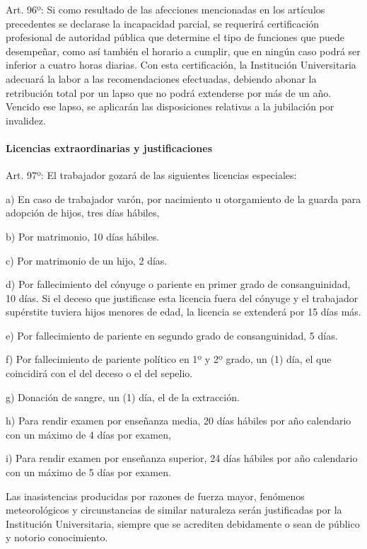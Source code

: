 \documentclass[]{article}
\let\oldparagraph\paragraph
\renewcommand{\paragraph}[1]{\oldparagraph{#1}\mbox{}}
\begin{document}
Art. 96º: Si como resultado de las afecciones mencionadas en los
artículos precedentes se declarase la incapacidad parcial, se requerirá
certificación profesional de autoridad pública que determine el tipo de
funciones que puede desempeñar, como así también el horario a cumplir,
que en ningún caso podrá ser inferior a cuatro horas diarias. Con esta
certificación, la Institución Universitaria adecuará la labor a las
recomendaciones efectuadas, debiendo abonar la retribución total por un
lapso que no podrá extenderse por más de un año. Vencido ese lapso, se
aplicarán las disposiciones relativas a la jubilación por invalidez.

\paragraph{Licencias extraordinarias y
justificaciones}\label{licencias-extraordinarias-y-justificaciones}

Art. 97º: El trabajador gozará de las siguientes licencias especiales:

a) En caso de trabajador varón, por nacimiento u otorgamiento de la
guarda para adopción de hijos, tres días hábiles,

b) Por matrimonio, 10 días hábiles.

c) Por matrimonio de un hijo, 2 días.

d) Por fallecimiento del cónyuge o pariente en primer grado de
consanguinidad, 10 días. Si el deceso que justificase esta licencia
fuera del cónyuge y el trabajador supérstite tuviera hijos menores de
edad, la licencia se extenderá por 15 días más.

e) Por fallecimiento de pariente en segundo grado de consanguinidad, 5
días.

f) Por fallecimiento de pariente político en 1º y 2º grado, un (1) día,
el que coincidirá con el del deceso o el del sepelio.

g) Donación de sangre, un (1) día, el de la extracción.

h) Para rendir examen por enseñanza media, 20 días hábiles por año
calendario con un máximo de 4 días por examen,

i) Para rendir examen por enseñanza superior, 24 días hábiles por año
calendario con un máximo de 5 días por examen.

Las inasistencias producidas por razones de fuerza mayor, fenómenos
meteorológicos y circunstancias de similar naturaleza serán justificadas
por la Institución Universitaria, siempre que se acrediten debidamente o
sean de público y notorio conocimiento.
\end{document}
